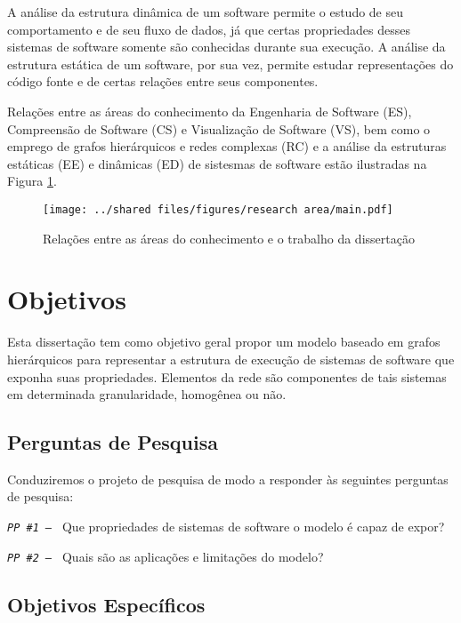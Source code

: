 A análise da estrutura dinâmica de um software permite o estudo de seu
comportamento e de seu fluxo de dados, já que certas propriedades desses
sistemas de software somente são conhecidas durante sua execução. A análise da
estrutura estática de um software, por sua vez, permite estudar representações
do código fonte e de certas relações entre seus componentes.

Relações entre as áreas do conhecimento da Engenharia de Software (ES),
Compreensão de Software (CS) e Visualização de Software (VS), bem como o emprego
de grafos hierárquicos e redes complexas (RC) e a análise da estruturas
estáticas (EE) e dinâmicas (ED) de sistesmas de software estão ilustradas na
Figura \ref{fig:RelaçãoConhecimentoTrabalho}.

\begin{figure}[!htb]
    \centering
    \caption{Relações entre as áreas do conhecimento e o trabalho da dissertação}
    \texttt{[image: ../shared files/figures/research area/main.pdf]}
    \label{fig:RelaçãoConhecimentoTrabalho}
\end{figure}

\section{Objetivos}
\label{sec:Objetivos}

Esta dissertação tem como objetivo geral propor um modelo baseado em grafos
hierárquicos para representar a estrutura de execução de sistemas de software
que exponha suas propriedades.
Elementos da rede são componentes de tais sistemas em determinada granularidade,
homogênea ou não.

\subsection{Perguntas de Pesquisa}
\label{subsec:PerguntasPesquisa}

Conduziremos o projeto de pesquisa de modo a responder às seguintes perguntas de
pesquisa:

\noindent
\texttt{\textit{PP \#1 -- }}
Que propriedades de sistemas de software o modelo é capaz de expor?

\noindent
\texttt{\textit{PP \#2 -- }}
Quais são as aplicações e limitações do modelo?

\subsection{Objetivos Específicos}
\label{subsec:ObjetivosEspecíficos}

